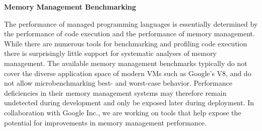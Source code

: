 {\bf{Memory Management Benchmarking}}

The performance of managed programming languages is essentially determined by the performance of code execution and the performance of memory management. While there are numerous tools for benchmarking and profiling code execution there is surprisingly little support for systematic analyses of memory management. The available memory management benchmarks typically do not cover the diverse application space of modern VMs such as Google's V8, and do not allow microbenchmarking best- and worst-case behavior. Performance deficiencies in their memory management systems may therefore remain undetected during development and only be exposed later during deployment. In collaboration with Google Inc., we are working on tools that help expose the potential for improvements in memory management performance.